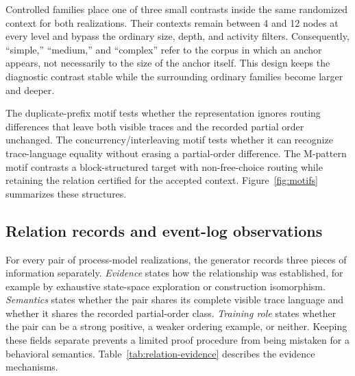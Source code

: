 \documentclass[pdflatex,sn-basic]{sn-jnl}
\begin{document}
Controlled families place one of three small contrasts inside the same randomized context for both realizations. Their contexts remain between 4 and 12 nodes at every level and bypass the ordinary size, depth, and activity filters. Consequently, ``simple,'' ``medium,'' and ``complex'' refer to the corpus in which an anchor appears, not necessarily to the size of the anchor itself. This design keeps the diagnostic contrast stable while the surrounding ordinary families become larger and deeper.

The duplicate-prefix motif tests whether the representation ignores routing differences that leave both visible traces and the recorded partial order unchanged. The concurrency/interleaving motif tests whether it can recognize trace-language equality without erasing a partial-order difference. The M-pattern motif contrasts a block-structured target with non-free-choice routing while retaining the relation certified for the accepted context. Figure~\ref{fig:motifs} summarizes these structures.



\FloatBarrier

\subsection{Relation records and event-log observations}\label{sec:relations}

For every pair of process-model realizations, the generator records three pieces of information separately. \emph{Evidence} states how the relationship was established, for example by exhaustive state-space exploration or construction isomorphism. \emph{Semantics} states whether the pair shares its complete visible trace language and whether it shares the recorded partial-order class. \emph{Training role} states whether the pair can be a strong positive, a weaker ordering example, or neither. Keeping these fields separate prevents a limited proof procedure from being mistaken for a behavioral semantics. Table~\ref{tab:relation-evidence} describes the evidence mechanisms.
\end{document}
